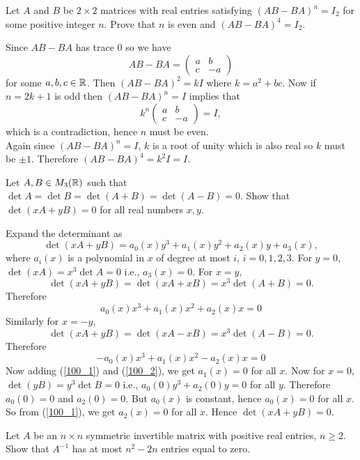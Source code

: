 \question Let $A$ and $B$ be $2\times 2$ matrices with real entries satisfying $(AB-BA)^n=I_2$ for some positive integer $n$. Prove that $n$ is even and $(AB-BA)^4=I_2$.

\begin{solution}
    Since $AB-BA$ has trace 0 so we have $$AB-BA=\begin{pmatrix}a&b\\c&-a\end{pmatrix}$$ for some $a,b,c\in\mathbb{R}$. Then $(AB-BA)^2=kI$ where $k=a^2+bc$. Now if $n=2k+1$ is odd then $(AB-BA)^n=I$ implies that
    $$k^n\begin{pmatrix}a&b\\c&-a\end{pmatrix}=I,$$
    which is a contradiction, hence $n$ must be even.\\
    Again since $(AB-BA)^n=I$, $k$ is a root of unity which is also real so $k$ must be $\pm 1$. Therefore $(AB-BA)^4=k^2I=I$.
\end{solution}

\question Let $A,B\in M_3(\mathbb{R})$ such that $\det{A}=\det{B}=\det{(A+B)}=\det{(A-B)}=0$. Show that $\det{(xA+yB)}=0$ for all real numbers $x,y$.

\begin{solution}
    Expand the determinant as $$\det{(xA+yB)}=a_0(x)y^3+a_1(x)y^2+a_2(x)y+a_3(x),$$
    where $a_i(x)$ is a polynomial in $x$ of degree at most $i$, $i=0,1,2,3$. For $y=0$, $\det{(xA)}=x^3\det{A}=0$ i.e., $a_3(x)=0$. For $x=y$, $$\det{(xA+yB)}=\det{(xA+xB)}=x^3\det{(A+B)}=0.$$
    Therefore
    \begin{equation}\label{100_1}
        a_0(x)x^3+a_1(x)x^2+a_2(x)x=0
    \end{equation}
    Similarly for $x=-y$, $$\det{(xA+yB)}=\det{(xA-xB)}=x^3\det{(A-B)}=0.$$
    Therefore
    \begin{equation}\label{100_2}
        -a_0(x)x^3+a_1(x)x^2-a_2(x)x=0
    \end{equation}
    Now adding (\ref{100_1}) and (\ref{100_2}), we get $a_1(x)=0$ for all $x$. Now for $x=0$, $\det{(yB)}=y^3\det{B}=0$ i.e., $a_0(0)y^3+a_2(0)y=0$ for all $y$. Therefore $a_0(0)=0$ and $a_2(0)=0$. But $a_0(x)$ is constant, hence $a_0(x)=0$ for all $x$. So from (\ref{100_1}), we get $a_2(x)=0$ for all $x$. Hence $\det{(xA+yB)}=0$.
\end{solution}

\question Let $A$ be an $n\times n$ symmetric invertible matrix with positive real entries, $n\geq 2$. Show that $A^{-1}$ has at most $n^2-2n$ entries equal to zero.

